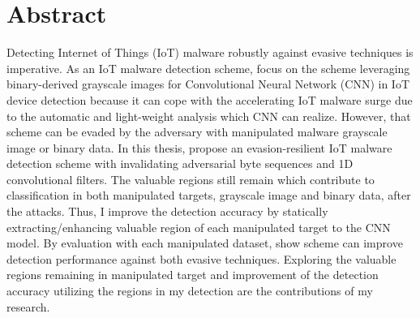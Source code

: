\section*{Abstract}


Detecting Internet of Things (IoT) malware robustly against evasive techniques is imperative.
As an IoT malware detection scheme, \we focus on the scheme leveraging binary-derived grayscale images for Convolutional Neural Network (CNN) in IoT device detection because it can cope with the accelerating IoT malware surge due to the automatic and light-weight analysis which CNN can realize.
However, that scheme can be evaded by the adversary with manipulated malware grayscale image or binary data.
In this thesis, \we propose an evasion-resilient IoT malware detection scheme with invalidating adversarial byte sequences and 1D convolutional filters.
The valuable regions still remain which contribute to classification in both manipulated targets, grayscale image and binary data, after the attacks.
Thus, I improve the detection accuracy by statically extracting/enhancing valuable region of each manipulated target to the CNN model.
By evaluation with each manipulated dataset, \we show \our scheme can improve detection performance against both evasive techniques. 
Exploring the valuable regions remaining in manipulated target and improvement of the detection accuracy utilizing the regions in my detection are the contributions of my research. 
